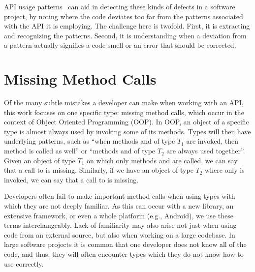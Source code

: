 API usage patterns~\cite{robillard2013automated} can aid in detecting these kinds of defects in a software project, by noting where the code deviates too far from the patterns associated with the API it is employing.
The challenge here is twofold.
First, it is extracting and recognizing the patterns.
Second, it is understanding when a deviation from a pattern actually signifies a code smell or an error that should be corrected.

\section{Missing Method Calls}

Of the many subtle mistakes a developer can make when working with an API, this work focuses on one specific type: missing method calls, which occur in the context of Object Oriented Programming (OOP).
In OOP, an object of a specific type is almost always used by invoking some of its methods.
Types will then have underlying patterns, such as ``when methods  and  of type $T_1$ are invoked, then method  is called as well'' or ``methods  and  of type $T_2$ are always used together''.
Given an object of type $T_1$ on which only methods  and  are called, we can say that a call to  is missing.
Similarly, if we have an object of type $T_2$ where only  is invoked, we can say that a call to  is missing.

Developers often fail to make important method calls when using types with which they are not deeply familiar.
As this can occur with a new library, an extensive framework, or even a whole platform (e.g., Android), we use these terms interchangeably.
Lack of familiarity may also arise not just when using code from an external source, but also when working on a large codebase.
In large software projects it is common that one developer does not know all of the code, and thus, they will often encounter types which they do not know how to use correctly.

